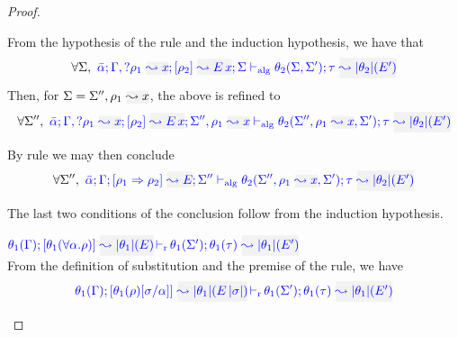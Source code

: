 \begin{proof}
\begin{description}
  From the hypothesis of the rule and the induction hypothesis, we have that
\begin{equation*}
\forall\Sigma,~\admres{\bar\alpha}{\tenv,\envi{\rulet_1}{x}}{\rulet_2}{\mmapp{E}{x}}{\Sigma}{\type}{\etrans{\theta_2}(E')}{\theta_2(\Sigma,\Sigma')}
\end{equation*}
Then, for $\Sigma = \Sigma'',\ie{\rulet_1}{x}$, the above is refined to
\begin{equation*}
\forall \Sigma'',~\admres{\bar\alpha}{\tenv,\envi{\rulet_1}{x}}{\rulet_2}{\mmapp{E}{x}}{\Sigma'',\ie{\rulet_1}{x}}{\type}{\etrans{\theta_2}(E')}{\theta_2(\Sigma'',\ie{\rulet_1}{x},\Sigma')}
\end{equation*}

  By rule  we may then conclude
\begin{equation*}
\forall\Sigma'',~\admres{\bar\alpha}{\tenv}{\rulet_1\To\rulet_2}{E}{\Sigma''}{\type}{\etrans{\theta_2}(E')}{\theta_2(\Sigma'',\ie{\rulet_1}{x},\Sigma')}
\end{equation*}

The last two conditions of the conclusion follow from the induction hypothesis.

\item[\fbox{\rref{M-TApp}}]\quad
$\dmres{\theta_1(\tenv)}{\theta_1(\tall{\alpha}{\rulet})}{\etrans{\theta_1}(E)}{\theta_1(\type)}{\etrans{\theta_1}(E')}{\theta_1(\Sigma')}$\ \\

From the definition of substitution and the premise of the rule, we have
\begin{equation*}
  \dmres{\theta_1(\tenv)}{\theta_1(\rulet)[\suty/\alpha]}{\etrans{\theta_1}(\mmapp{E}{\etrans{\suty}})}{\theta_1(\type)}{\etrans{\theta_1}(E')}{\theta_1(\Sigma')}
\end{equation*}


\end{description}
\end{proof}
